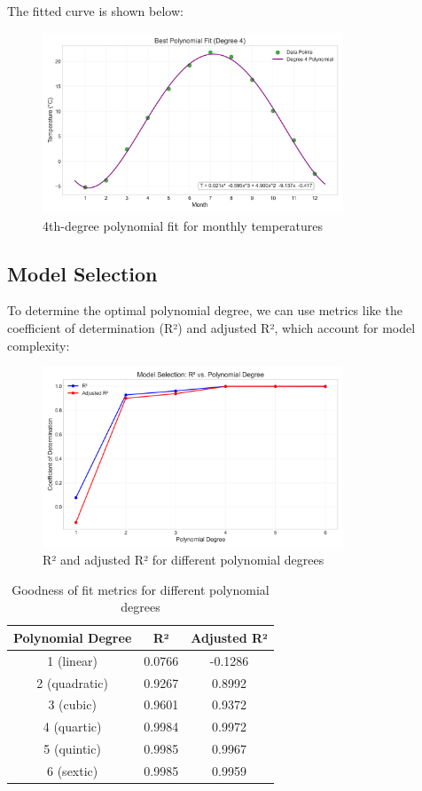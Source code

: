 \documentclass[12pt]{article}
\begin{document}
The fitted curve is shown below:

\begin{figure}[H]
\centering
\includegraphics[width=0.8\textwidth]{temperature_fit.png}
\caption{4th-degree polynomial fit for monthly temperatures}
\label{fig:temperature_fit}
\end{figure}

\subsection{Model Selection}

To determine the optimal polynomial degree, we can use metrics like the coefficient of determination (R²) and adjusted R², which account for model complexity:

\begin{figure}[H]
\centering
\includegraphics[width=0.8\textwidth]{temperature_r2.png}
\caption{R² and adjusted R² for different polynomial degrees}
\label{fig:temperature_r2}
\end{figure}

\begin{table}[H]
\centering
\begin{tabular}{ccc}
\toprule
Polynomial Degree & R² & Adjusted R² \\
\midrule
1 (linear) & 0.0766 & -0.1286 \\
2 (quadratic) & 0.9267 & 0.8992 \\
3 (cubic) & 0.9601 & 0.9372 \\
4 (quartic) & 0.9984 & 0.9972 \\
5 (quintic) & 0.9985 & 0.9967 \\
6 (sextic) & 0.9985 & 0.9959 \\
\bottomrule
\end{tabular}
\caption{Goodness of fit metrics for different polynomial degrees}
\label{tab:polynomial_comparison}
\end{table}
\end{document}
